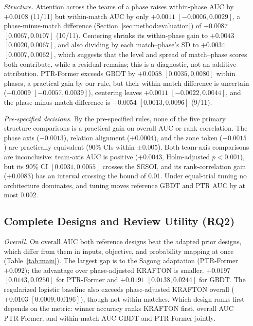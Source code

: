 \documentclass[sigconf,anonymous]{acmart}
\begin{document}
\emph{Structure.} Attention across the teams of a phase raises within-phase AUC by $+0.0108$ (11/11) but within-match AUC by only $+0.0011$ $[-0.0006,\allowbreak 0.0029]$, a phase-minus-match difference (Section~\ref{sec:method:evaluation}) of $+0.0087$ $[0.0067,\allowbreak 0.0107]$ (10/11). Centering shrinks its within-phase gain to $+0.0043$ $[0.0020,\allowbreak 0.0067]$, and also dividing by each match--phase's SD to $+0.0034$ $[0.0007,\allowbreak 0.0062]$, which suggests that the level and spread of match--phase scores both contribute, while a residual remains; this is a diagnostic, not an additive attribution. PTR-Former exceeds GBDT by $+0.0058$ $[0.0035,\allowbreak 0.0080]$ within phases, a practical gain by our rule, but their within-match difference is uncertain ($-0.0009$ $[-0.0057,\allowbreak 0.0039]$), centering leaves $+0.0011$ $[-0.0022,\allowbreak 0.0044]$, and the phase-minus-match difference is $+0.0054$ $[0.0013,\allowbreak 0.0096]$ (9/11).

\emph{Pre-specified decisions.} By the pre-specified rules, none of the five primary structure comparisons is a practical gain on overall AUC or rank correlation. The phase axis ($-0.0013$), relation alignment ($+0.0004$), and the zone token ($+0.0015$) are practically equivalent (90\% CIs within $\pm0.005$). Both team-axis comparisons are inconclusive: team-axis AUC is positive ($+0.0043$, Holm-adjusted $p<0.001$), but its 90\% CI $[0.0031,\allowbreak 0.0055]$ crosses the SESOI, and its rank-correlation gain ($+0.0083$) has an interval crossing the bound of 0.01. Under equal-trial tuning no architecture dominates, and tuning moves reference GBDT and PTR AUC by at most 0.002.

\subsection{Complete Designs and Review Utility (RQ2)}
\label{sec:results:designs}

\emph{Overall.} On overall AUC both reference designs beat the adapted prior designs, which differ from them in inputs, objective, and probability mapping at once (Table~\ref{tab:main}). The largest gap is to the Sagong adaptation (PTR-Former $+0.092$); the advantage over phase-adjusted KRAFTON is smaller, $+0.0197$ $[0.0143,\allowbreak 0.0250]$ for PTR-Former and $+0.0191$ $[0.0138,\allowbreak 0.0244]$ for GBDT. The regularized logistic baseline also exceeds phase-adjusted KRAFTON overall ($+0.0103$ $[0.0009,\allowbreak 0.0196]$), though not within matches. Which design ranks first depends on the metric: winner accuracy ranks KRAFTON first, overall AUC PTR-Former, and within-match AUC GBDT and PTR-Former jointly.
\end{document}
